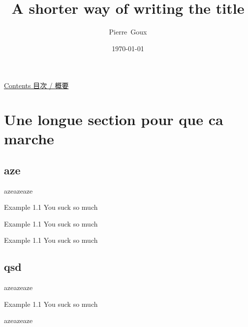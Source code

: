 \documentclass[aspectratio=169,compress]{beamer}
\title{A shorter way of writing the title}
\author
{Pierre~Goux}
\date{\today}
\begin{document}
\begin{CJK}{UTF8}{min}



\begin{frame}{\underline{Contents 目次 / 概要}}
\vspace*{1em}
\begin{minipage}{.1\linewidth}\hfill\vfill\end{minipage}\begin{minipage}{.8\linewidth}\tableofcontents[pausesections]\end{minipage}
\end{frame}

\section{Une longue section pour que ca marche}
\subsection{aze}
\begin{frame}{azeazeaze}

\vspace{1em}
\begin{block}{Example 1.1}
You suck so much
\end{block}
\begin{exampleblock}{Example 1.1}
You suck so much
\end{exampleblock}
\begin{alertblock}{Example 1.1}
You suck so much
\end{alertblock}

\end{frame}
\subsection{qsd}

\begin{frame}{azeazeaze}

\vspace{1em}
\begin{block}{Example 1.1}
You suck so much
\end{block}


\end{frame}
\begin{frame}{azeazeaze}


\end{frame}
\end{CJK}
\end{document}
